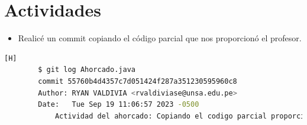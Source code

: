 \documentclass{article}
\begin{document}
	\section{Actividades}
	
	\begin{itemize}	
		\item Realicé un commit copiando el código parcial que nos proporcionó el profesor.
	\end{itemize}	
	\begin{lstlisting}[language=bash,caption={Comentando el código paricial}][H]
		$ git log Ahorcado.java
		commit 55760b4d4357c7d051424f287a351230595960c8
		Author: RYAN VALDIVIA <rvaldiviase@unsa.edu.pe>
		Date:   Tue Sep 19 11:06:57 2023 -0500
			Actividad del ahorcado: Copiando el codigo parcial proporcionado
	\end{lstlisting}
\end{document}
